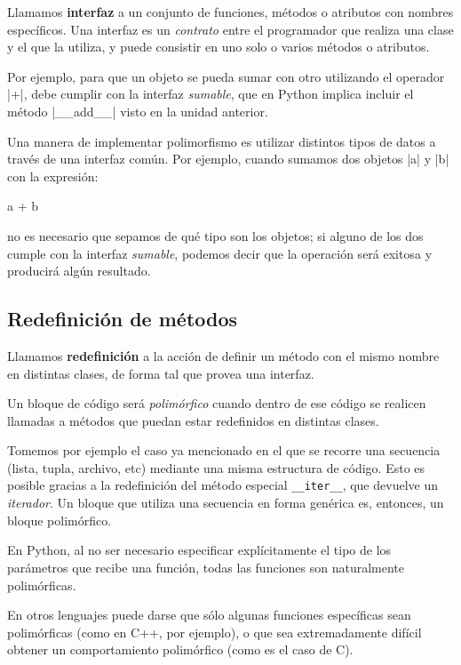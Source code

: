 Llamamos {\bf interfaz} a un conjunto de funciones, métodos o atributos con
nombres específicos.  Una interfaz es un {\it contrato} entre el
programador que realiza una clase y el que la utiliza, y puede consistir en
uno solo o varios métodos o atributos.

Por ejemplo, para que un objeto se pueda sumar con otro utilizando el
operador |+|, debe cumplir con la interfaz {\it sumable}, que en Python
implica incluir el método |__add__| visto en la unidad anterior.

Una manera de implementar polimorfismo es utilizar distintos tipos de
datos a través de una interfaz común. Por ejemplo, cuando sumamos dos
objetos |a| y |b| con la expresión:

\begin{codigo-python-sn}
a + b
\end{codigo-python-sn}

\noindent no es necesario que sepamos de qué tipo son los objetos; si
alguno de los dos cumple con la interfaz {\it sumable}, podemos decir
que la operación será exitosa y producirá algún resultado.

\subsection{Redefinición de métodos}

Llamamos {\bf redefinición} a la acción de definir un método con el mismo
nombre en distintas clases, de forma tal que provea una interfaz.

Un bloque de código será {\it polimórfico} cuando dentro de ese código se
realicen llamadas a métodos que puedan estar redefinidos en distintas
clases.

Tomemos por ejemplo el caso ya mencionado en el que se recorre una
secuencia (lista, tupla, archivo, etc) mediante una misma estructura de
código.  Esto es posible gracias a la redefinición del método especial
\lstinline!__iter__!, que devuelve un {\it iterador}.  Un bloque que
utiliza una secuencia en forma genérica es, entonces, un bloque
polimórfico.

\begin{sabias_que}
En Python, al no ser necesario especificar explícitamente el tipo de los
parámetros que recibe una función, todas las funciones son naturalmente
polimórficas.

En otros lenguajes puede darse que sólo algunas funciones específicas sean
polimórficas (como en C++, por ejemplo), o que sea extremadamente difícil
obtener un comportamiento polimórfico (como es el caso de C).
\end{sabias_que}

